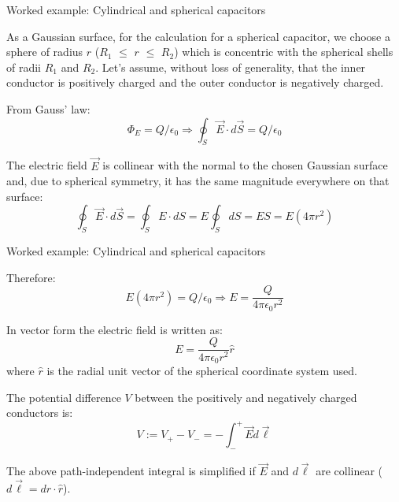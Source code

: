 {%
%
%

\begin{frame}{Worked example: Cylindrical and spherical capacitors}


  As a Gaussian surface, for the calculation for a spherical capacitor,
  we choose a sphere of radius $r$ ($R_1$ $\le$ $r$ $\le$ $R_2$)
  which is concentric with the spherical shells of radii $R_1$ and $R_2$.
  Let's assume, without loss of generality, that the inner conductor is
  positively charged and the outer conductor is negatively charged.

  From Gauss' law:
  \begin{equation*}
    \Phi_E = Q/\epsilon_0 \Rightarrow
    \oint_{S} \vec{E} \cdot d\vec{S} = Q/\epsilon_0
  \end{equation*}

  The electric field $\vec{E}$
  is collinear with the normal to the chosen Gaussian surface and, due to
  spherical symmetry, it has the same magnitude everywhere on that
  surface:
  \begin{equation*}
    \oint_{S} \vec{E} \cdot d\vec{S} =
    \oint_{S} E \cdot dS =
    E \oint_{S} dS =
    E S =
    E (4\pi r^2)
  \end{equation*}

\end{frame}

%
%
%

\begin{frame}{Worked example: Cylindrical and spherical capacitors}

  Therefore:
  \begin{equation*}
    E (4\pi r^2) = Q/\epsilon_0 \Rightarrow
    E = \frac{Q}{4\pi \epsilon_0 r^2}
  \end{equation*}

  In vector form the electric field is written as:
  \begin{equation*}
    E = \frac{Q}{4\pi \epsilon_0 r^2} \hat{r}
  \end{equation*}
  where $\hat{r}$ is the radial unit vector of the spherical coordinate
  system used.

  The potential difference $V$ between the positively and negatively
  charged conductors is:
  \begin{equation*}
      V := V_{+} - V_{-} = - \int_{-}^{+} \vec{E} d\vec{\ell}
  \end{equation*}

  The above path-independent integral is
  simplified if $\vec{E}$ and $d\vec{\ell}$ are collinear
  ($d\vec{\ell} = dr \cdot \hat{r}$).


\end{frame}}
